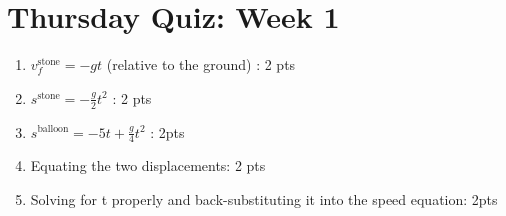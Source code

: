 \documentclass{article}
\begin{document}
\section{Thursday Quiz: Week 1}
\label{sec:thursday_quiz_week_1}
\begin{enumerate}
   \item
$ v_{f}^{\textrm{stone}} = - gt $ (relative to the ground) : 2 pts
\item $ s^{\textrm{stone}} = -\frac{g}{2}t^{2} $ : 2 pts
\item $ s^{\textrm{balloon}} = -5t + \frac{g}{4} t^{2} $ : 2pts
\item Equating the two displacements: 2 pts
\item Solving for t properly and back-substituting it into the speed equation:
   2pts
\end{enumerate}
\end{document}
